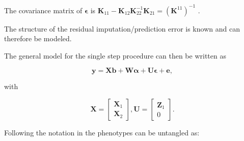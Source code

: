 \documentclass[12pt,titlepage]{article}
\begin{document}
The covariance matrix of $\boldsymbol{\epsilon}$ is $\mathbf{K}_{11} -
\mathbf{K}_{12}\mathbf{K}^{-1}_{22}\mathbf{K}_{21} =
(\mathbf{K}^{11})^{-1}$
\cite{Legarra2009}.

The structure of the residual imputation/prediction error is known and can 
therefore be modeled.

The general model for the single step procedure can then be written as 

\begin{equation} \label{eq:single-step-model}
\mathbf{y} =
\mathbf{Xb} + \mathbf{W} \boldsymbol{\alpha} + \mathbf{U} \boldsymbol{\epsilon} + \mathbf{e},
\end{equation}

with

\begin{equation} \label{eq:single-step-submatrices}
\mathbf{X} =
\begin{bmatrix}
  \mathbf{X}_1 \\
  \mathbf{X}_2
 \end{bmatrix},
 \mathbf{U} =
\begin{bmatrix}
  \mathbf{Z}_1 \\
  0
 \end{bmatrix}.
\end{equation}

Following the notation in  the phenotypes can be untangled 
as:
\end{document}
